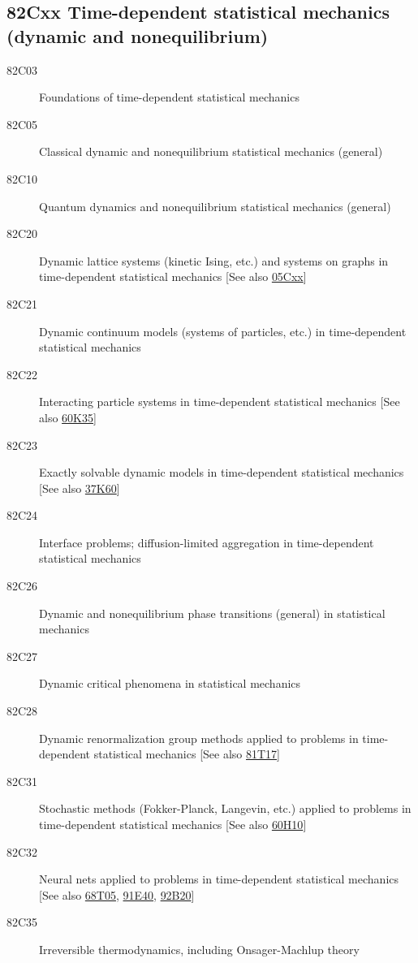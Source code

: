 \subsection*{82Cxx  Time-dependent statistical mechanics (dynamic and nonequilibrium) }\label{82Cxx}
\begin{description}  
\item [82C03]\label{82C03} Foundations of time-dependent statistical mechanics
\item [82C05]\label{82C05} Classical dynamic and nonequilibrium statistical mechanics (general)
\item [82C10]\label{82C10} Quantum dynamics and nonequilibrium statistical mechanics (general)
\item [82C20]\label{82C20} Dynamic lattice systems (kinetic Ising, etc.) and systems on graphs in time-dependent statistical mechanics [See also \hyperref[05Cxx]{05Cxx}]
\item [82C21]\label{82C21} Dynamic continuum models (systems of particles, etc.) in time-dependent statistical mechanics
\item [82C22]\label{82C22} Interacting particle systems in time-dependent statistical mechanics [See also \hyperref[60K35]{60K35}]
\item [82C23]\label{82C23} Exactly solvable dynamic models in time-dependent statistical mechanics [See also \hyperref[37K60]{37K60}]
\item [82C24]\label{82C24} Interface problems; diffusion-limited aggregation in time-dependent statistical mechanics
\item [82C26]\label{82C26} Dynamic and nonequilibrium phase transitions (general) in statistical mechanics
\item [82C27]\label{82C27} Dynamic critical phenomena in statistical mechanics
\item [82C28]\label{82C28} Dynamic renormalization group methods applied to problems in time-dependent statistical mechanics [See also \hyperref[81T17]{81T17}]
\item [82C31]\label{82C31} Stochastic methods (Fokker-Planck, Langevin, etc.) applied to problems in time-dependent statistical mechanics [See also \hyperref[60H10]{60H10}]
\item [82C32]\label{82C32} Neural nets applied to problems in time-dependent statistical mechanics [See also \hyperref[68T05]{68T05}, \hyperref[91E40]{91E40}, \hyperref[92B20]{92B20}]
\item [82C35]\label{82C35} Irreversible thermodynamics, including Onsager-Machlup theory

\end{description}
